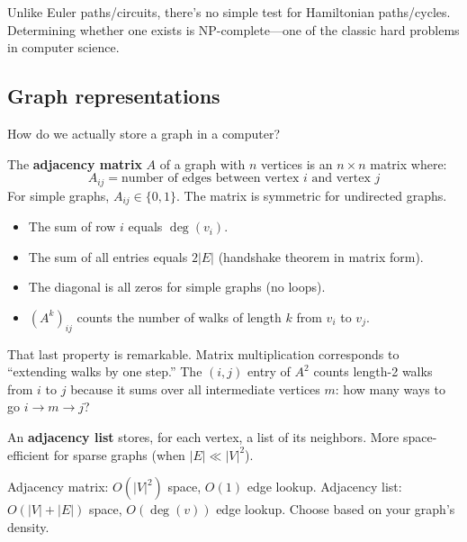 \begin{remark}
Unlike Euler paths/circuits, there's no simple test for Hamiltonian paths/cycles. Determining whether one exists is NP-complete---one of the classic hard problems in computer science.
\end{remark}

\subsection*{Graph representations}

How do we actually store a graph in a computer?

\begin{definition}
The \textbf{adjacency matrix} $A$ of a graph with $n$ vertices is an $n \times n$ matrix where:
\[
A_{ij} = \text{number of edges between vertex } i \text{ and vertex } j
\]
For simple graphs, $A_{ij} \in \{0, 1\}$. The matrix is symmetric for undirected graphs.
\end{definition}

\begin{proposition}
\begin{itemize}
  \item The sum of row $i$ equals $\deg(v_i)$.
  \item The sum of all entries equals $2|E|$ (handshake theorem in matrix form).
  \item The diagonal is all zeros for simple graphs (no loops).
  \item $(A^k)_{ij}$ counts the number of walks of length $k$ from $v_i$ to $v_j$.
\end{itemize}
\end{proposition}

That last property is remarkable. Matrix multiplication corresponds to ``extending walks by one step.'' The $(i,j)$ entry of $A^2$ counts length-2 walks from $i$ to $j$ because it sums over all intermediate vertices $m$: how many ways to go $i \to m \to j$?

\begin{definition}
An \textbf{adjacency list} stores, for each vertex, a list of its neighbors. More space-efficient for sparse graphs (when $|E| \ll |V|^2$).
\end{definition}

Adjacency matrix: $O(|V|^2)$ space, $O(1)$ edge lookup.
Adjacency list: $O(|V| + |E|)$ space, $O(\deg(v))$ edge lookup.
Choose based on your graph's density.

